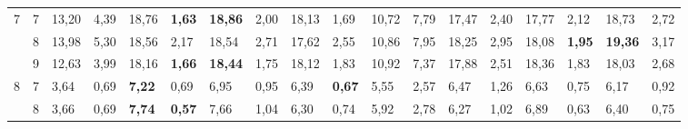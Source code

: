 \documentclass[conference]{IEEEtran}
\begin{document}
\begin{table}[]
\begin{tabular}{|cl|ll|ll|ll|ll|ll|ll|ll|ll|}
		\multicolumn{1}{|c|}{\multirow{3}{*}{7}}  & 7          & \multicolumn{1}{l|}{13,20}         & 4,39          & \multicolumn{1}{l|}{18,76}          & \textbf{1,63} & \multicolumn{1}{l|}{\textbf{18,86}} & 2,00          & \multicolumn{1}{l|}{18,13}         & 1,69          & \multicolumn{1}{l|}{10,72}                & 7,79 & \multicolumn{1}{l|}{17,47}          & 2,40 & \multicolumn{1}{l|}{17,77}          & 2,12          & \multicolumn{1}{l|}{18,73}          & 2,72 \\ \cline{2-18} 
		\multicolumn{1}{|c|}{}                    & 8          & \multicolumn{1}{l|}{13,98}         & 5,30          & \multicolumn{1}{l|}{18,56}          & 2,17          & \multicolumn{1}{l|}{18,54}          & 2,71          & \multicolumn{1}{l|}{17,62}         & 2,55          & \multicolumn{1}{l|}{10,86}                & 7,95 & \multicolumn{1}{l|}{18,25}          & 2,95 & \multicolumn{1}{l|}{18,08}          & \textbf{1,95} & \multicolumn{1}{l|}{\textbf{19,36}} & 3,17 \\ \cline{2-18} 
		\multicolumn{1}{|c|}{}                    & 9          & \multicolumn{1}{l|}{12,63}         & 3,99          & \multicolumn{1}{l|}{18,16}          & \textbf{1,66} & \multicolumn{1}{l|}{\textbf{18,44}} & 1,75          & \multicolumn{1}{l|}{18,12}         & 1,83          & \multicolumn{1}{l|}{10,92}                & 7,37 & \multicolumn{1}{l|}{17,88}          & 2,51 & \multicolumn{1}{l|}{18,36}          & 1,83          & \multicolumn{1}{l|}{18,03}          & 2,68 \\ \hline
		\multicolumn{1}{|c|}{\multirow{3}{*}{8}}  & 7          & \multicolumn{1}{l|}{3,64}          & 0,69          & \multicolumn{1}{l|}{\textbf{7,22}}  & 0,69          & \multicolumn{1}{l|}{6,95}           & 0,95          & \multicolumn{1}{l|}{6,39}          & \textbf{0,67} & \multicolumn{1}{l|}{5,55}                 & 2,57 & \multicolumn{1}{l|}{6,47}           & 1,26 & \multicolumn{1}{l|}{6,63}           & 0,75          & \multicolumn{1}{l|}{6,17}           & 0,92 \\ \cline{2-18} 
		\multicolumn{1}{|c|}{}                    & 8          & \multicolumn{1}{l|}{3,66}          & 0,69          & \multicolumn{1}{l|}{\textbf{7,74}}  & \textbf{0,57} & \multicolumn{1}{l|}{7,66}           & 1,04          & \multicolumn{1}{l|}{6,30}          & 0,74          & \multicolumn{1}{l|}{5,92}                 & 2,78 & \multicolumn{1}{l|}{6,27}           & 1,02 & \multicolumn{1}{l|}{6,89}           & 0,63          & \multicolumn{1}{l|}{6,40}           & 0,75 \\ \cline{2-18} 

\end{tabular}
\end{table}
\end{document}
